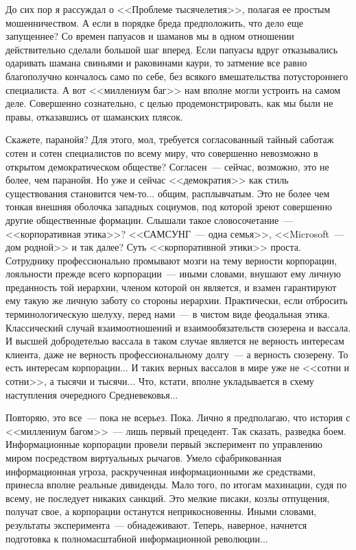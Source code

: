 \documentclass{scrbook}
\newcommand{\flqq}{<<}
\newcommand{\frqq}{>>}
\newcommand{\mdash}{~--- }
\begin{document}
До сих пор я рассуждал о {\flqq}Проблеме тысячелетия{\frqq}, полагая ее простым мошенничеством. А если в порядке бреда предположить, что дело еще запущеннее? Со времен папуасов и шаманов мы в одном отношении действительно сделали большой шаг вперед. Если папуасы вдруг отказывались одаривать шамана свиньями и раковинами каури, то затмение все равно благополучно кончалось само по себе, без всякого вмешательства потустороннего специалиста. А вот {\flqq}миллениум баг{\frqq} нам вполне могли устроить на самом деле. Совершенно сознательно, с целью продемонстрировать, как мы были не правы, отказавшись от шаманских плясок.

Скажете, паранойя? Для этого, мол, требуется согласованный тайный саботаж сотен и сотен специалистов по всему миру, что совершенно невозможно в открытом демократическом обществе? Согласен{\mdash}сейчас, возможно, это не более, чем паранойя. Но уже и сейчас {\flqq}демократия{\frqq} как стиль существования становится чем-то... общим, расплывчатым. Это не более чем тонкая внешняя оболочка западных социумов, под которой зреют совершенно другие общественные формации. Слышали такое словосочетание{\mdash}{\flqq}корпоративная этика{\frqq}? {\flqq}САМСУНГ{\mdash}одна семья{\frqq}, {\flqq}Microsoft{\mdash}дом родной{\frqq} и так далее? Суть {\flqq}корпоративной этики{\frqq} проста. Сотруднику профессионально промывают мозги на тему верности корпорации, лояльности прежде всего корпорации{\mdash}иными словами, внушают ему личную преданность той иерархии, членом которой он является, и взамен гарантируют ему такую же личную заботу со стороны иерархии. Практически, если отбросить терминологическую шелуху, перед нами{\mdash}в чистом виде феодальная этика. Классический случай взаимоотношений и взаимообязательств сюзерена и вассала. И высшей добродетелью вассала в таком случае является не верность интересам клиента, даже не верность профессиональному долгу{\mdash}а верность сюзерену. То есть интересам корпорации... И таких верных вассалов в мире уже не {\flqq}сотни и сотни{\frqq}, а тысячи и тысячи... Что, кстати, вполне укладывается в схему наступления очередного Средневековья...

Повторяю, это все{\mdash}пока не всерьез. Пока. Лично я предполагаю, что история с {\flqq}миллениум багом{\frqq}{\mdash}лишь первый прецедент. Так сказать, разведка боем. Информационные корпорации провели первый эксперимент по управлению миром посредством виртуальных рычагов. Умело сфабрикованная информационная угроза, раскрученная информационными же средствами, принесла вполне реальные дивиденды. Мало того, по итогам махинации, судя по всему, не последует никаких санкций. Это мелкие писаки, козлы отпущения, получат свое, а корпорации останутся неприкосновенны. Иными словами, результаты эксперимента{\mdash}обнадеживают. Теперь, наверное, начнется подготовка к полномасштабной информационной революции...
\end{document}
